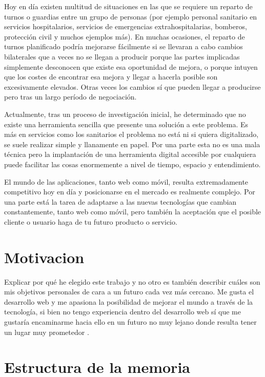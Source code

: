 

Hoy en día existen multitud de situaciones en las que se requiere un reparto de turnos o guardias entre un grupo de personas (por ejemplo personal sanitario en servicios hospitalarios, servicios de emergencias extrahospitalarias, bomberos, protección civil y muchos ejemplos más). En muchas ocasiones, el reparto de turnos planificado podría mejorarse fácilmente si se llevaran a cabo cambios bilaterales que a veces no se llegan a producir porque las partes implicadas simplemente desconocen que existe esa oportunidad de mejora, o porque intuyen que los costes de encontrar esa mejora y llegar a  hacerla posible son excesivamente elevados. Otras veces los cambios sí que pueden llegar a producirse pero tras un largo período de negociación.

Actualmente, tras un proceso de investigación inicial, he determinado que no existe una herramienta sencilla que presente una solución a este problema. Es más en servicios como los sanitarios el problema no está ni si quiera digitalizado, se suele realizar simple y llanamente en papel. Por una parte esta no es una mala técnica pero la implantación de una herramienta digital accesible por cualquiera puede facilitar las cosas enormemente a nivel de tiempo, espacio y entendimiento. 

El mundo de las aplicaciones, tanto web como móvil, resulta extremadamente competitivo hoy en día y posicionarse en el mercado es realmente complejo. Por una parte está la tarea de adaptarse a las nuevas tecnologías que cambian constantemente, tanto web como móvil, pero también la aceptación que el posible cliente o usuario haga de tu futuro producto o servicio.

\section{Motivacion}\label{Motivacion}

Explicar por qué he elegido este trabajo y no otro es también describir cuáles son mis objetivos personales de cara a un futuro cada vez más cercano.  Me gusta el desarrollo web y me apasiona la posibilidad de mejorar el mundo a través de la tecnología, si bien no tengo experiencia dentro del desarrollo web sí que me gustaría encaminarme hacia ello en un futuro no muy lejano donde resulta tener un lugar muy prometedor \citep{desarrolloweb1}.

\section{Estructura de la memoria}\label{estructura-de-la-memoria}

